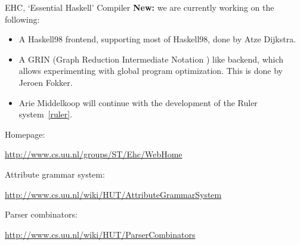 \begin{hcarentry}{EHC, `Essential Haskell' Compiler}
\textbf{New:}
we are currently working on the following:
\begin{itemize}
\item
   A Haskell98 frontend, supporting most of Haskell98, done by Atze Dijkstra.
\item
   A GRIN (Graph Reduction Intermediate Notation \cite{boquist99phd-optim-lazy}) like backend,
   which allows experimenting with global program optimization.
   This is done by Jeroen Fokker.
\item
   Arie Middelkoop will continue with the development of the Ruler system~\cref{ruler}. 
\end{itemize}

\FurtherReading
\begin{compactitem}
\item Homepage:

\url{http://www.cs.uu.nl/groups/ST/Ehc/WebHome}

\item Attribute grammar system:

\url{http://www.cs.uu.nl/wiki/HUT/AttributeGrammarSystem}

\item Parser combinators:

\url{http://www.cs.uu.nl/wiki/HUT/ParserCombinators}
\end{compactitem}
\end{hcarentry}


